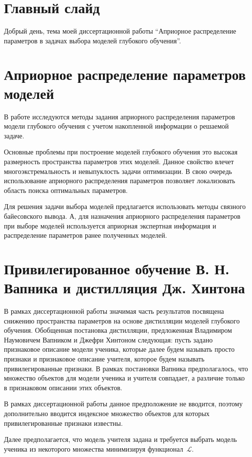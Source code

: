 \documentclass[10pt, twoside]{article}
\begin{document}
\section{Главный слайд}
Добрый день, тема моей диссертационной работы ``Априорное распределение параметров в задачах выбора моделей глубокого обучения''.

\section{Априорное распределение параметров моделей}
В работе исследуются методы задания априорного распределения параметров модели глубокого обучения с учетом накопленной информации о решаемой задаче.

Основные проблемы при построение моделей глубокого обучения это высокая размерность пространства параметров этих моделей. Данное свойство влечет многоэкстремальность и невыпуклость задачи оптимизации. В свою очередь использование априорного распределения параметров позволяет локализовать область поиска оптимальных параметров.

Для решения задачи выбора моделей предлагается использовать методы связного байесовского вывода. А, для назначения априорного распределения параметров при выборе моделей используется априорная экспертная информация и распределение параметров ранее полученных моделей.

\section{Привилегированное обучение В. Н. Вапника и дистилляция Дж. Хинтона}
В рамках диссертационной работы значимая часть результатов посвящена снижению пространства параметров на основе дистилляции моделей глубокого обучения.
Обобщенная постановка дистилляции, предложенная Владимиром Наумовичем Вапником и Джефри Хинтоном следующая: пусть задано признаковое описание модели ученика, которые далее будем называть просто признаки и признаковое описание учителя, которое будем называть привилегированные признаки. В рамках постановки Вапника предполагалось, что множество объектов для модели ученика и учителя совпадает, а различие только в признаковом описании этих объектов.

В рамках диссертационной работы данное предположение не вводится, поэтому дополнительно вводится индексное множество объектов для которых привилегированные признаки известны.

Далее предполагается, что модель учителя задана и требуется выбрать модель ученика из некоторого множества минимизируя функционал~$\mathcal{L}$.
\end{document}
